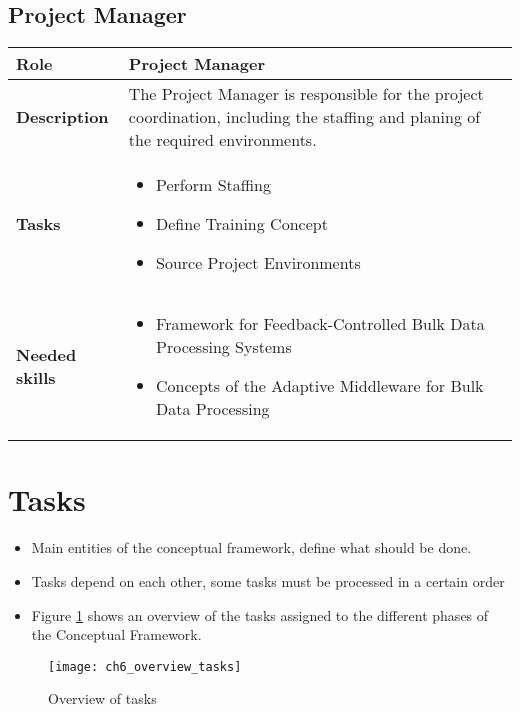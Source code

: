 \subsection{Project Manager}
\begin{minipage}{\textwidth}
 \label{table:ch6_Role_Project_Manager}
\begin{tabular}
	{|m{2cm}|m{10cm}|} \hline \bfseries Role & Project Manager\\
	\hline \bfseries Description & The Project Manager is responsible for the project coordination, including the staffing and planing of the required environments.\\
	\hline \bfseries Tasks & 
	\begin{itemize}
		\item Perform Staffing
		\item Define Training Concept
		\item Source Project Environments
	\end{itemize}
	\\
	\hline 
	\bfseries Needed skills &
	\begin{itemize}
		\item Framework for Feedback-Controlled Bulk Data Processing Systems
		\item Concepts of the Adaptive Middleware for Bulk Data Processing
	\end{itemize}
	\\
	\hline
\end{tabular}
\end{minipage}

\section{Tasks}
\label{sec:ch6_tasks}

\begin{itemize}
	\item Main entities of the conceptual framework, define what should be done.
	\item Tasks depend on each other, some tasks must be processed in a certain order
	\item Figure \ref{fig:ch6_overview_tasks} shows an overview of the tasks assigned to the different phases of the Conceptual Framework.
\end{itemize}

\begin{figure}[htpb] \centering 
	\texttt{[image: ch6\_overview\_tasks]} 
	\caption{Overview of tasks} 
	\label{fig:ch6_overview_tasks} 
\end{figure}

